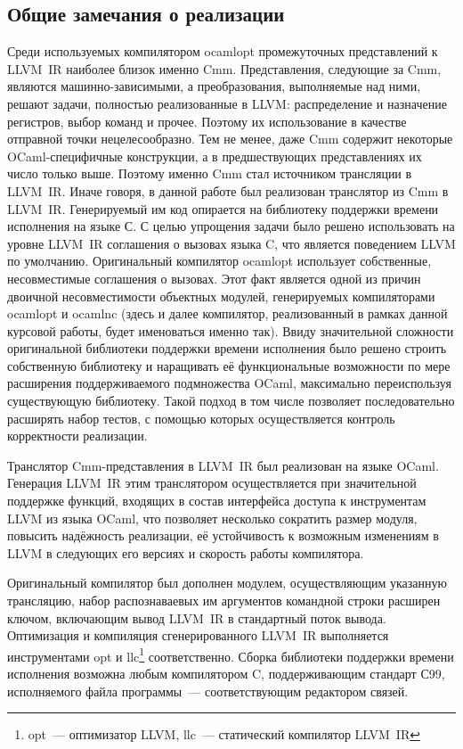 \documentclass[a4paper, 12pt]{article}
\begin{document}
\subsection{Общие замечания о реализации}
Среди используемых компилятором ocamlopt промежуточных представлений к LLVM~IR наиболее близок именно Cmm.
Представления, следующие за Cmm, являются машинно-зависимыми, а преобразования, выполняемые над ними, решают задачи,
полностью реализованные в LLVM: распределение и назначение регистров, выбор команд и прочее. Поэтому их использование
в качестве отправной точки нецелесообразно. Тем не менее, даже Cmm содержит некоторые OCaml-специфичные конструкции,
а в предшествующих представлениях их число только выше. Поэтому именно Cmm стал источником
трансляции в LLVM~IR. Иначе говоря, в данной работе был реализован транслятор из Cmm в LLVM~IR. Генерируемый им код
опирается на библиотеку поддержки времени исполнения на языке С. С целью упрощения задачи было решено использовать
на уровне LLVM~IR соглашения о вызовах языка C, что является поведением LLVM по умолчанию. Оригинальный компилятор
ocamlopt использует собственные, несовместимые соглашения о вызовах. Этот факт является одной из причин двоичной
несовместимости объектных модулей, генерируемых компиляторами ocamlopt и ocamlnc (здесь и далее компилятор,
реализованный в рамках данной курсовой работы, будет именоваться именно так). Ввиду значительной сложности
оригинальной библиотеки поддержки времени исполнения было решено строить собственную библиотеку и наращивать её
функциональные возможности по мере расширения поддерживаемого подмножества OCaml, максимально переиспользуя существующую
библиотеку. Такой подход в том числе позволяет последовательно расширять набор тестов, с помощью которых осуществляется
контроль корректности реализации.

Транслятор Cmm-представления в LLVM~IR был реализован на языке OCaml. Генерация LLVM~IR этим транслятором осуществляется
при значительной поддержке функций, входящих в состав интерфейса доступа к инструментам LLVM из языка OCaml, что
позволяет несколько сократить размер модуля, повысить надёжность реализации, её устойчивость к возможным изменениям в
LLVM в следующих его версиях и скорость работы компилятора.

Оригинальный компилятор был дополнен модулем, осуществляющим указанную трансляцию, набор распознаваевых им аргументов
командной строки расширен ключом, включающим вывод LLVM~IR в стандартный поток вывода. Оптимизация и компиляция
сгенерированного LLVM~IR выполняется инструментами opt и llc\footnote{opt~--- оптимизатор LLVM, llc~--- статический
компилятор LLVM~IR} соответственно. Сборка библиотеки поддержки времени исполнения возможна любым компилятором C,
поддерживающим стандарт С99, исполняемого файла программы~--- соответствующим редактором связей.
\end{document}
